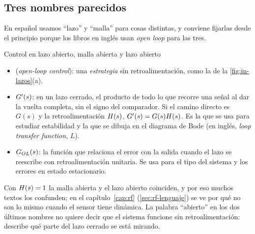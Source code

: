 \subsection{Tres nombres parecidos}
\label{sec:in-nombres}

En español usamos ``lazo'' y ``malla'' para cosas distintas, y conviene fijarlas desde el principio porque los libros en inglés usan \emph{open loop} para las tres.

\begin{definicion}[label=def:in-nombres]{Control en lazo abierto, malla abierta y lazo abierto}
\begin{itemize}[leftmargin=1.2em]
  \item {} (\emph{open-loop control}): una \emph{estrategia} sin retroalimentación, como la de la \cref{fig:in-lazos}(a).
  \item {} $G'(s)$: en un lazo cerrado, el producto de todo lo que recorre una señal al dar la vuelta completa, sin el signo del comparador. Si el camino directo es $G(s)$ y la retroalimentación $H(s)$, $G'(s)=G(s)H(s)$. Es la que se usa para estudiar estabilidad y la que se dibuja en el diagrama de Bode (en inglés, \emph{loop transfer function}, $L$).
  \item {} $G_{OL}(s)$: la función que relaciona el error con la salida cuando el lazo se reescribe con retroalimentación unitaria. Se usa para el tipo del sistema y los errores en estado estacionario.
\end{itemize}
\end{definicion}

Con $H(s)=1$ la malla abierta y el lazo abierto coinciden, y por eso muchos textos los confunden; en el capítulo~\ref{cap:rf} (\cref{sec:rf-lenguaje}) se ve por qué no son lo mismo cuando el sensor tiene dinámica. La palabra ``abierto'' en los dos últimos nombres no quiere decir que el sistema funcione sin retroalimentación: describe qué parte del lazo cerrado se está mirando.
